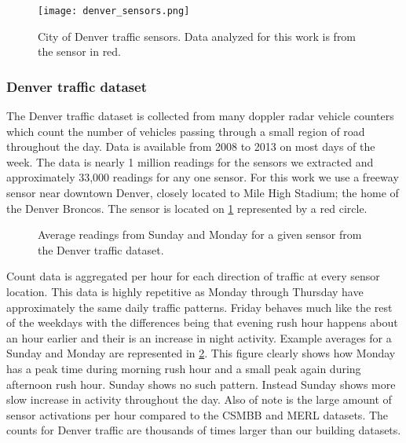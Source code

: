\begin{figure}[!b]
	\begin{center}
		\texttt{[image: denver\_sensors.png]}
	\end{center}
	\caption{City of Denver traffic sensors.  Data analyzed for this work is from the sensor in red.}
	\label{fig:denvertraffic}
\end{figure}

\subsubsection{Denver traffic dataset}
The Denver traffic dataset is collected from many doppler radar vehicle counters which count the number of vehicles passing through a small region of road throughout the day.  Data is available from 2008 to 2013 on most days of the week.  The data is nearly 1 million readings for the sensors we extracted and approximately 33,000 readings for any one sensor.  For this work we use a freeway sensor near downtown Denver, closely located to Mile High Stadium; the home of the Denver Broncos.  The sensor is located on \ref{fig:denvertraffic} represented by a red circle.

\begin{figure}[t]
	\begin{center}
	\end{center}
	\caption{Average readings from Sunday and Monday for a given sensor from the Denver traffic dataset.}
	\label{fig:denver_day_raw}
\end{figure}

Count data is aggregated per hour for each direction of traffic at every sensor location.  This data is highly repetitive as Monday through Thursday have approximately the same daily traffic patterns.  Friday behaves much like the rest of the weekdays with the differences being that evening rush hour happens about an hour earlier and their is an increase in night activity.   Example averages for a Sunday and Monday are represented in \ref{fig:denver_day_raw}.  This figure clearly shows how Monday has a peak time during morning rush hour and a small peak again during afternoon rush hour.  Sunday shows no such pattern.  Instead Sunday shows more slow increase in activity throughout the day.  Also of note is the large amount of sensor activations per hour compared to the CSMBB and MERL datasets.  The counts for Denver traffic are thousands of times larger than our building datasets.

